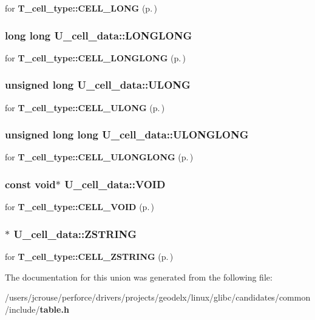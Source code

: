for {\bf T\_\-cell\_\-type::CELL\_\-LONG} {\rm (p.\,\pageref{table_8h_a37a16})} 
\subsubsection{\setlength{\rightskip}{0pt plus 5cm}long long U\_\-cell\_\-data::LONGLONG}\label{unionU__cell__data_m3}


for {\bf T\_\-cell\_\-type::CELL\_\-LONGLONG} {\rm (p.\,\pageref{table_8h_a37a18})} 
\subsubsection{\setlength{\rightskip}{0pt plus 5cm}unsigned long U\_\-cell\_\-data::ULONG}\label{unionU__cell__data_m2}


for {\bf T\_\-cell\_\-type::CELL\_\-ULONG} {\rm (p.\,\pageref{table_8h_a37a17})} 
\subsubsection{\setlength{\rightskip}{0pt plus 5cm}unsigned long long U\_\-cell\_\-data::ULONGLONG}\label{unionU__cell__data_m4}


for {\bf T\_\-cell\_\-type::CELL\_\-ULONGLONG} {\rm (p.\,\pageref{table_8h_a37a19})} 
\subsubsection{\setlength{\rightskip}{0pt plus 5cm}const void$\ast$ U\_\-cell\_\-data::VOID}\label{unionU__cell__data_m5}


for {\bf T\_\-cell\_\-type::CELL\_\-VOID} {\rm (p.\,\pageref{table_8h_a37a20})} 
\subsubsection{$\ast$ U\_\-cell\_\-data::ZSTRING}\label{unionU__cell__data_m6}


for {\bf T\_\-cell\_\-type::CELL\_\-ZSTRING} {\rm (p.\,\pageref{table_8h_a37a21})} 

The documentation for this union was generated from the following file:\begin{CompactItemize}
\item 
/users/jcrouse/perforce/drivers/projects/geodelx/linux/glibc/candidates/common/include/{\bf table.h}\end{CompactItemize}
